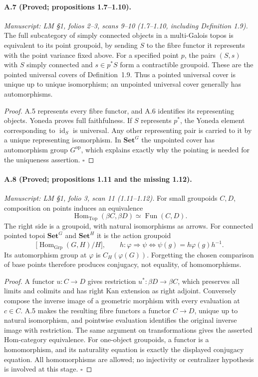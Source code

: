 \paragraph{A.7 (Proved; propositions 1.7--1.10).}
\textit{Manuscript: LM \S1, folios 2--3, scans 9--10 (1.7--1.10, including Definition 1.9).}
The full subcategory of simply connected objects in a multi-Galois topos is equivalent to its point groupoid, by sending $S$ to the fibre functor it represents with the point variance fixed above. For a specified point $p$, the pairs $(S,s)$ with $S$ simply connected and $s\in p^*S$ form a contractible groupoid. These are the pointed universal covers of Definition~1.9. Thus a pointed universal cover is unique up to unique isomorphism; an unpointed universal cover generally has automorphisms.
\begin{proof}
A.5 represents every fibre functor, and A.6 identifies its representing objects. Yoneda proves full faithfulness. If $S$ represents $p^*$, the Yoneda element corresponding to $\operatorname{id}_S$ is universal. Any other representing pair is carried to it by a unique representing isomorphism. In $\mathbf{Set}^{G}$ the unpointed cover has automorphism group $G^{\mathrm{op}}$, which explains exactly why the pointing is needed for the uniqueness assertion. \hfill$\square$
\end{proof}

\paragraph{A.8 (Proved; propositions 1.11 and the missing 1.12).}
\textit{Manuscript: LM \S1, folio 3, scan 11 (1.11--1.12).}
For small groupoids $C,D$, composition on points induces an equivalence
\[
 \operatorname{Hom}_{\mathrm{Top}}(\beta C,\beta D)
 \simeq\operatorname{Fun}(C,D).
\]
The right side is a groupoid, with natural isomorphisms as arrows. For connected pointed topoi $\mathbf{Set}^{G}$ and $\mathbf{Set}^{H}$ it is the action groupoid
\[
 \bigl[\operatorname{Hom}_{\mathrm{Grp}}(G,H)/H\bigr],
 \qquad h:\varphi\Rightarrow\psi\iff\psi(g)=h\varphi(g)h^{-1}.
\]
Its automorphism group at $\varphi$ is $C_H(\varphi(G))$. Forgetting the chosen comparison of base points therefore produces conjugacy, not equality, of homomorphisms.
\begin{proof}
A functor $u:C\to D$ gives restriction $u^*:\beta D\to\beta C$, which preserves all limits and colimits and has right Kan extension as right adjoint. Conversely compose the inverse image of a geometric morphism with every evaluation at $c\in C$. A.5 makes the resulting fibre functors a functor $C\to D$, unique up to natural isomorphism, and pointwise evaluation identifies the original inverse image with restriction. The same argument on transformations gives the asserted Hom-category equivalence. For one-object groupoids, a functor is a homomorphism, and its naturality equation is exactly the displayed conjugacy equation. All homomorphisms are allowed; no injectivity or centralizer hypothesis is involved at this stage. \hfill$\square$
\end{proof}

